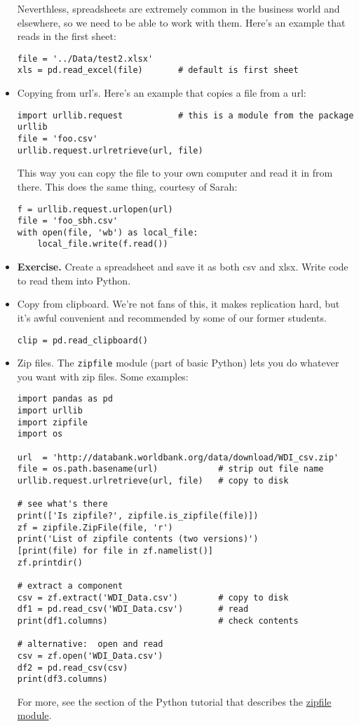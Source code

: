 \documentclass[11pt]{article}
\begin{document}
\begin{itemize}
Neverthless, spreadsheets are extremely common in the business world and elsewhere,
so we need to be able to work with them.
Here's an example that reads in the first sheet:
\begin{verbatim}
file = '../Data/test2.xlsx'
xls = pd.read_excel(file)       # default is first sheet
\end{verbatim}


\item Copying from url's.
Here's an example that copies a file from a url:
\begin{verbatim}
import urllib.request           # this is a module from the package urllib
file = 'foo.csv'
urllib.request.urlretrieve(url, file)
\end{verbatim}
This way you can copy the file to your own computer and read it in from there.
This does the same thing, courtesy of Sarah:
\begin{verbatim}
f = urllib.request.urlopen(url)
file = 'foo_sbh.csv'
with open(file, 'wb') as local_file:
    local_file.write(f.read())
\end{verbatim}

\item {\bf Exercise.}  Create a spreadsheet and save it as both csv and xlsx.
Write code to read them into Python.


\item Copy from clipboard.
We're not fans of this, it makes replication hard, but it's awful convenient
and recommended by some of our former students.

\begin{verbatim}
clip = pd.read_clipboard()
\end{verbatim}

\item Zip files.  The {\tt zipfile} module (part of basic Python)
lets you do whatever you want with zip files.
Some examples:
\begin{verbatim}
import pandas as pd
import urllib
import zipfile
import os

url  = 'http://databank.worldbank.org/data/download/WDI_csv.zip'
file = os.path.basename(url)            # strip out file name
urllib.request.urlretrieve(url, file)   # copy to disk

# see what's there
print(['Is zipfile?', zipfile.is_zipfile(file)])
zf = zipfile.ZipFile(file, 'r')
print('List of zipfile contents (two versions)')
[print(file) for file in zf.namelist()]
zf.printdir()

# extract a component
csv = zf.extract('WDI_Data.csv')        # copy to disk
df1 = pd.read_csv('WDI_Data.csv')       # read
print(df1.columns)                      # check contents

# alternative:  open and read
csv = zf.open('WDI_Data.csv')
df2 = pd.read_csv(csv)
print(df3.columns)
\end{verbatim}
For more, see the section of the Python tutorial that describes the
\href{https://docs.python.org/3.4/library/zipfile.html#module-zipfile}{zipfile module}.


\end{itemize}
\end{document}
